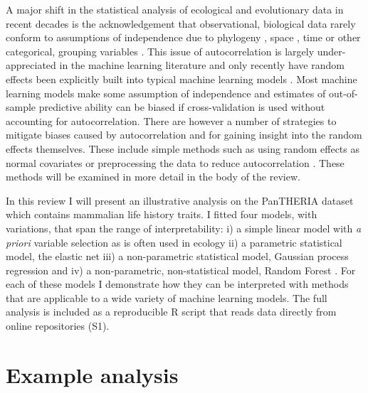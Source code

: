 \documentclass[10pt,]{article}
\begin{document}
\begin{figure*}[t]
{\begin{minipage}{1\textwidth}
\end{minipage}

}
\normalcolor
\end{figure*}


A major shift in the statistical analysis of ecological and evolutionary data in recent decades is the acknowledgement that observational, biological data rarely conform to assumptions of independence due to phylogeny \citep{felsenstein1985phylogenies, ives2006statistics}, space \citep{redding2017evaluating, diggle1998model}, time \citep{ives2006statistics} or other categorical, grouping variables \citep{harrison2018brief, bolker2009generalized}.
This issue of autocorrelation is largely under-appreciated in the machine learning literature and only recently have random effects been explicitly built into typical machine learning models \citep{eo2014tree, hajjem2014mixed, hajjem2017generalized, miller2017gradient}.
Most machine learning models make some assumption of independence and estimates of out-of-sample predictive ability can be biased if cross-validation is used without accounting for autocorrelation.
There are however a number of strategies to mitigate biases caused by autocorrelation and for gaining insight into the random effects themselves.
These include simple methods such as using random effects as normal covariates or preprocessing the data to reduce autocorrelation \citep{elith2010art}.
These methods will be examined in more detail in the body of the review.

In this review I will present an illustrative analysis on the PanTHERIA dataset \citep{jones2009pantheria} which contains mammalian life history traits.
I fitted four models, with variations, that span the range of interpretability: i) a simple linear model with \emph{a priori} variable selection as is often used in ecology ii) a parametric statistical model, the elastic net \citep{elasticnet} iii) a non-parametric statistical model, Gaussian process regression \citep{rasmussen2004gaussian} and iv) a non-parametric, non-statistical model, Random Forest \citep{breiman2001random}.
For each of these models I demonstrate how they can be interpreted with methods that are applicable to a wide variety of machine learning models.
The full analysis is included as a reproducible R \citep{R} script that reads data directly from online repositories (S1).

\section{Example analysis}\label{example-analysis}
\end{document}
